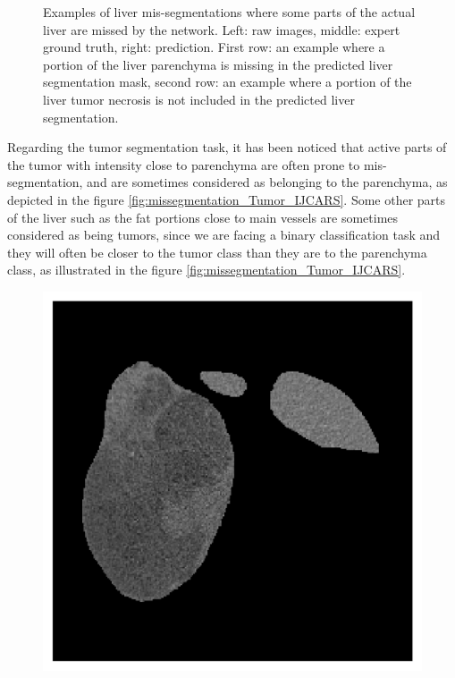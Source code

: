 {\begin{figure}[!ht]
\begin{mdframed}[backgroundcolor=blue!50,linecolor=blue!50]
\begin{minipage}{4cm}
	\end{minipage}
	\caption{Examples of liver mis-segmentations where some parts of the actual liver are missed by the network. Left: raw images, middle: expert ground truth, right: prediction. First row: an example where a portion of the liver parenchyma is missing in the predicted liver segmentation mask, second row: an example where a portion of the liver tumor necrosis is not included in the predicted liver segmentation.}
	\label{fig:missegmentation_Liver2_IJCARS}
	\end{mdframed}
\end{figure} 
Regarding the tumor segmentation task, it has been noticed that active parts of the tumor with intensity close to parenchyma are often prone to mis-segmentation, and are sometimes considered as belonging to the parenchyma, as depicted in the figure \ref{fig:missegmentation_Tumor_IJCARS}. Some other parts of the liver such as the fat portions close to main vessels are sometimes considered as being tumors, since we are facing a binary classification task and they will often be closer to the tumor class than they are to the parenchyma class, as illustrated in the figure \ref{fig:missegmentation_Tumor_IJCARS}.
\begin{figure}[!ht]
	\begin{mdframed}[backgroundcolor=blue!50,linecolor=blue!50]
	\centering
	\begin{minipage}{4cm}
		\includegraphics[width=\linewidth]{images/TumorMult_Raw_Pat5_0}

\end{minipage}
\end{mdframed}
\end{figure}}
